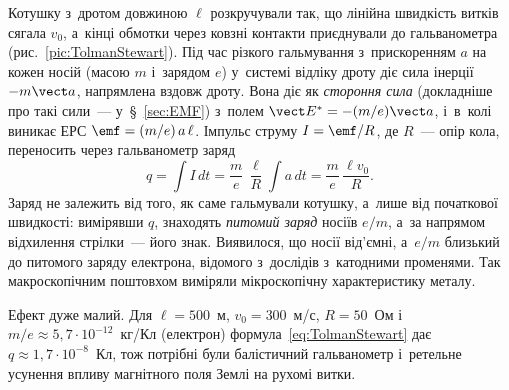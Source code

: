 Котушку з~дротом довжиною $\ell$ розкручували так, що лінійна швидкість витків сягала
$v_0$, а~кінці обмотки через ковзні контакти приєднували до гальванометра
(рис.~\ref{pic:TolmanStewart}). Під час різкого гальмування з~прискоренням $a$ на кожен
носій (масою $m$ і~зарядом $e$) у~системі відліку дроту діє сила інерції $-m\vect a$,
напрямлена вздовж дроту. Вона діє як \emph{стороння сила} (докладніше про такі сили~--- у~\S~\ref{sec:EMF}) з~полем $\vect E^* =
-(m/e)\vect a$, і~в~колі виникає ЕРС $\emf = (m/e)\,a\,\ell$. Імпульс струму $I = \emf/R$,
де $R$~--- опір кола, переносить через гальванометр заряд
\begin{equation}\label{eq:TolmanStewart}
	q = \int I\,dt = \frac{m}{e}\,\frac{\ell}{R}\int a\,dt = \frac{m}{e}\,\frac{\ell v_0}{R}.
\end{equation}
Заряд не залежить від того, як саме гальмували котушку, а~лише від початкової швидкості:
вимірявши $q$, знаходять \emph{питомий заряд} носіїв $e/m$, а~за напрямом відхилення
стрілки~--- його знак. Виявилося, що носії від'ємні, а~$e/m$ близький до питомого заряду
електрона, відомого з~дослідів з~катодними променями. Так макроскопічним поштовхом
виміряли мікроскопічну характеристику металу.

Ефект дуже малий. Для $\ell = 500$~м, $v_0 = 300$~м/с, $R = 50$~Ом і~$m/e \approx
5{,}7\cdot10^{-12}$~кг/Кл (електрон) формула~\eqref{eq:TolmanStewart} дає $q \approx
1{,}7\cdot10^{-8}$~Кл, тож потрібні були балістичний гальванометр і~ретельне усунення
впливу магнітного поля Землі на рухомі витки.

